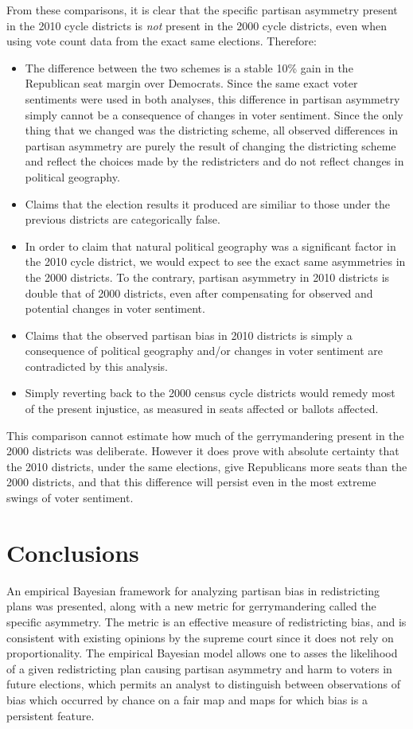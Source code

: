 \documentclass[preprint,12pt]{article}
\begin{document}
From these comparisons, it is clear that the specific partisan asymmetry present in the 2010 cycle districts is \emph{not} present in the 2000 cycle districts, even when using vote count data from the exact same elections.  Therefore:
\begin{itemize}

\item The difference between the two schemes is a stable 10\% gain in the Republican seat margin over Democrats.
Since the same exact voter sentiments were used in both analyses, this difference in partisan asymmetry simply cannot be a consequence of changes in voter sentiment.  
Since the only thing that we changed was the districting scheme, all observed differences in partisan asymmetry are purely the result of changing the districting scheme and reflect the choices made by the redistricters and do not reflect changes in political geography.
\item Claims that the election results it produced are similiar to those under the previous districts are categorically false.
\item In order to claim that natural political geography was a significant factor in the 2010 cycle district, we would expect to see the exact same asymmetries in the 2000 districts.
To the contrary, partisan asymmetry in 2010 districts is double that of 2000 districts, even after compensating for observed and potential changes in voter sentiment.
\item Claims that the observed partisan bias in 2010 districts is simply a consequence of political geography and/or changes in voter sentiment are contradicted by this analysis.
\item Simply reverting back to the 2000 census cycle districts would remedy most of the present injustice, as measured in seats affected or ballots affected.
\end{itemize}

This comparison cannot estimate how much of the gerrymandering present in the 2000 districts was deliberate.
However it does prove with absolute certainty that the 2010 districts, under the same elections, give Republicans more seats than the 2000 districts, and that this difference will persist even in the most extreme swings of voter sentiment.

\section{Conclusions}
An empirical Bayesian framework for analyzing partisan bias in redistricting plans was presented, along with a new metric for gerrymandering called the specific asymmetry.
The metric is an effective measure of redistricting bias, and is consistent with existing opinions by the supreme court since it does not rely on proportionality.
The empirical Bayesian model allows one to asses the likelihood of a given redistricting plan causing partisan asymmetry and harm to voters in future elections, which permits an analyst to distinguish between observations of bias which occurred by chance on a fair map and maps for which bias is a persistent feature.
\end{document}
